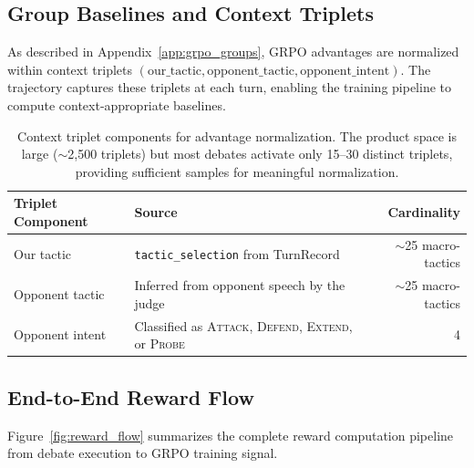 \subsection{Group Baselines and Context Triplets}

As described in Appendix~\ref{app:grpo_groups}, GRPO advantages are
normalized within context triplets
$(\text{our\_tactic}, \text{opponent\_tactic}, \text{opponent\_intent})$.
The trajectory captures these triplets at each turn, enabling the
training pipeline to compute context-appropriate baselines.

\begin{table}[h]
\centering
\small
\begin{tabular}{lp{5cm}r}
\toprule
\textbf{Triplet Component} & \textbf{Source} & \textbf{Cardinality} \\
\midrule
Our tactic & \texttt{tactic\_selection} from TurnRecord & $\sim$25 macro-tactics \\
Opponent tactic & Inferred from opponent speech by the judge & $\sim$25 macro-tactics \\
Opponent intent & Classified as \textsc{Attack}, \textsc{Defend}, \textsc{Extend}, or \textsc{Probe} & 4 \\
\bottomrule
\end{tabular}
\caption{Context triplet components for advantage normalization. The
product space is large ($\sim$2,500 triplets) but most debates activate
only 15--30 distinct triplets, providing sufficient samples for
meaningful normalization.}
\label{tab:context_triplets}
\end{table}

\subsection{End-to-End Reward Flow}

Figure~\ref{fig:reward_flow} summarizes the complete reward computation
pipeline from debate execution to GRPO training signal.

